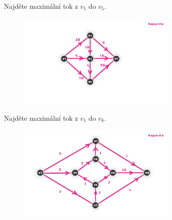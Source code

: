 \begin{t_exercise}
  \item Najděte maximální tok z $v_1$ do $v_5$.
  \begin{figure}[!htbp]
    \centering
    \includegraphics[width=0.7\textwidth]{img/net4.png}
  \end{figure}
  
  \item Najděte maximální tok z $v_1$ do $v_8$.
  \begin{figure}[!htbp]
    \centering
    \includegraphics[width=0.7\textwidth]{img/net5.png}
  \end{figure}
\end{t_exercise}
